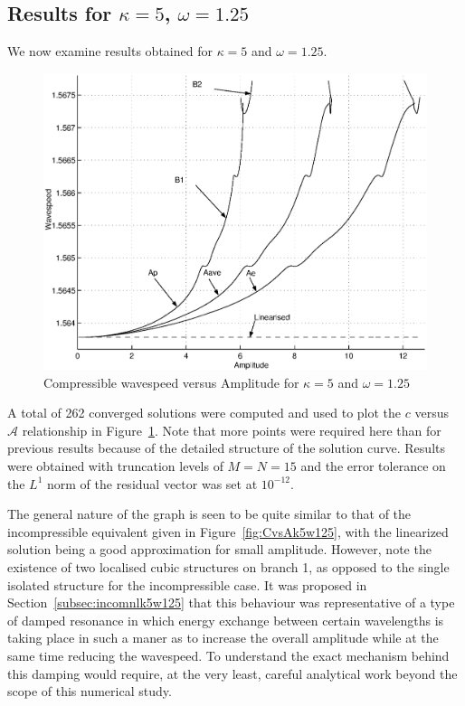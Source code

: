 \subsection[Results for $\kappa=5$, $\omega=1.25$]{Results for \boldmath$\kappa=5$, $\omega=1.25$}
We now examine results obtained for $\kappa=5$ and $\omega=1.25$.
\begin{figure}[htbp]
	\centering
		\includegraphics[scale=0.75]{IMAGES/CvsAk5w125com.eps}
	\caption{Compressible wavespeed versus Amplitude for $\kappa=5$ and $\omega=1.25$}
	\label{fig:CvsAk5w125com}
\end{figure}
A total of 262 converged solutions were computed and used to plot the $c$ versus $\mathcal{A}$ relationship in Figure~\ref{fig:CvsAk5w125com}. Note that more points were required here than for previous results because of the detailed structure of the solution curve. Results were obtained with truncation levels of $M=N=15$ and the error tolerance on the $L^1$ norm of the residual vector was set at $10^{-12}$.

The general nature of the graph is seen to be quite similar to that of the incompressible equivalent given in Figure~\ref{fig:CvsAk5w125}, with the linearized solution being a good approximation for small amplitude. However, note the existence of two localised cubic structures on branch 1, as opposed to the single isolated structure for the incompressible case. It was proposed in Section~\ref{subsec:incomnlk5w125} that this behaviour was representative of a type of damped resonance in which energy exchange between certain wavelengths is taking place in such a maner as to increase the overall amplitude while at the same time reducing the wavespeed. To understand the exact mechanism behind this damping would require, at the very least, careful analytical work beyond the scope of this numerical study. 

